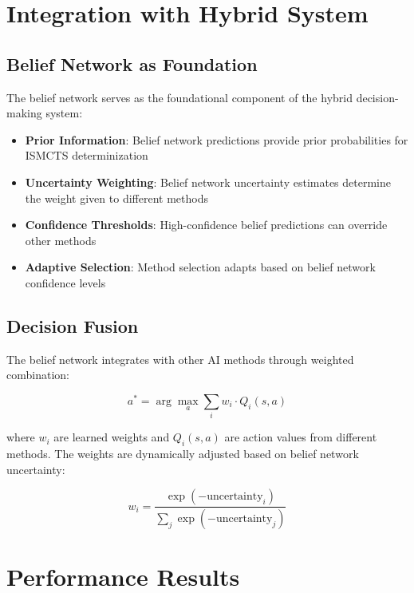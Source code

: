 \documentclass[conference]{IEEEtran}
\begin{document}
\section{Integration with Hybrid System}

\subsection{Belief Network as Foundation}

The belief network serves as the foundational component of the hybrid decision-making system:

\begin{itemize}
    \item \textbf{Prior Information}: Belief network predictions provide prior probabilities for ISMCTS determinization
    \item \textbf{Uncertainty Weighting}: Belief network uncertainty estimates determine the weight given to different methods
    \item \textbf{Confidence Thresholds}: High-confidence belief predictions can override other methods
    \item \textbf{Adaptive Selection}: Method selection adapts based on belief network confidence levels
\end{itemize}

\subsection{Decision Fusion}

The belief network integrates with other AI methods through weighted combination:

\begin{equation}
a^* = \arg\max_a \sum_{i} w_i \cdot Q_i(s,a)
\end{equation}

where $w_i$ are learned weights and $Q_i(s,a)$ are action values from different methods. The weights are dynamically adjusted based on belief network uncertainty:

\begin{equation}
w_i = \frac{\exp(-\text{uncertainty}_i)}{\sum_j \exp(-\text{uncertainty}_j)}
\end{equation}

\section{Performance Results}
\end{document}

